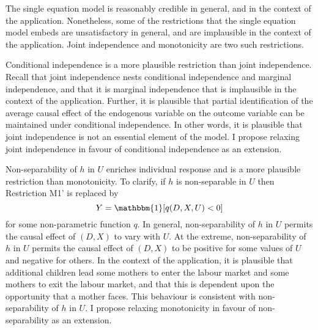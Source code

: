 \documentclass[10pt,a4paper,twoside]{article}
\numberwithin{equation}{section}
\begin{document}
The single equation model is reasonably credible in general, and in the context of the application. Nonetheless, some of the restrictions that the single equation model embeds are unsatisfactory in general, and are implausible in the context of the application. Joint independence and monotonicity are two such restrictions. 

Conditional independence is a more plausible restriction than joint independence. Recall that joint independence nests conditional independence and marginal independence, and that it is marginal independence that is implausible in the context of the application. Further, it is plausible that partial identification of the average causal effect of the endogenous variable on the outcome variable can be maintained under conditional independence. In other words, it is plausible that joint independence is not an essential element of the model. I propose relaxing joint independence in favour of conditional independence as an extension.

Non-separability of $h$ in $U$ enriches individual response and is a more plausible restriction than monotonicity. To clarify, if $h$ is non-separable in $U$ then Restriction M1' is replaced by  
\[Y=\mathbbm{1}[q(D,X,U)<0]\]
for some non-parametric function $q$. In general, non-separability of $h$ in $U$ permits the causal effect of $(D,X)$ to vary with $U$. At the extreme, non-separability of $h$ in $U$ permits the causal effect of $(D,X)$ to be positive for some values of $U$ and negative for others. In the context of the application, it is plausible that additional children lead some mothers to enter the labour market and some mothers to exit the labour market, and that this is dependent upon the opportunity that a mother faces. This behaviour is consistent with non-separability of $h$ in $U$. I propose relaxing monotonicity in favour of non-separability as an extension.
\end{document}
